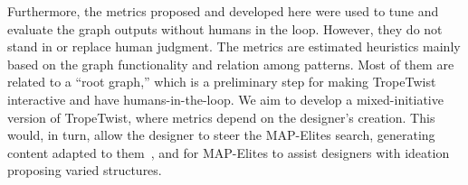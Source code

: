 









Furthermore, the metrics proposed and developed here were used to tune and evaluate the graph outputs without humans in the loop. However, they do not stand in or replace human judgment. The metrics are estimated heuristics mainly based on the graph functionality and relation among patterns. Most of them are related to a ``root graph,'' which is a preliminary step for making TropeTwist interactive and have humans-in-the-loop. We aim to develop a mixed-initiative version of TropeTwist, where metrics depend on the designer's creation. This would, in turn, allow the designer to steer the MAP-Elites search, generating content adapted to them~, and for MAP-Elites to assist designers with ideation proposing varied structures.


 